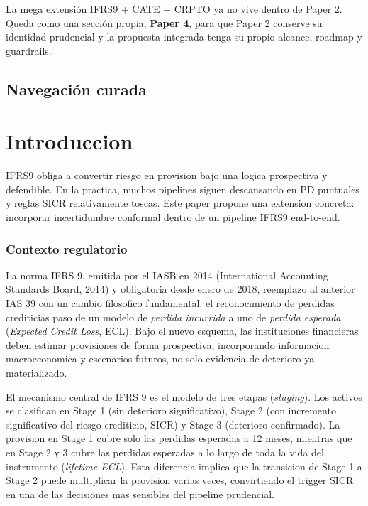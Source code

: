 \documentclass[
  spanish,
  11pt,
  letterpaper,
]{scrbook}
\theoremstyle{plain}
\theoremstyle{remark}
\begin{document}
La mega extensión IFRS9 + CATE + CRPTO ya no vive dentro de Paper 2.
Queda como una sección propia, \textbf{Paper 4}, para que Paper 2
conserve su identidad prudencial y la propuesta integrada tenga su
propio alcance, roadmap y guardrails.

\section{Navegación curada}\label{navegaciuxf3n-curada-4}

\chapter{Introduccion}\label{sec-p2-intro}

IFRS9 obliga a convertir riesgo en provision bajo una logica prospectiva
y defendible. En la practica, muchos pipelines siguen descansando en PD
puntuales y reglas SICR relativamente toscas. Este paper propone una
extension concreta: incorporar incertidumbre conformal dentro de un
pipeline IFRS9 end-to-end.

\subsection{Contexto regulatorio}\label{sec-p2-regulatory}

La norma IFRS 9, emitida por el IASB en 2014 (International Accounting
Standards Board, 2014) y obligatoria desde enero de 2018, reemplazo al
anterior IAS 39 con un cambio filosofico fundamental: el reconocimiento
de perdidas crediticias paso de un modelo de \emph{perdida incurrida} a
uno de \emph{perdida esperada} (\emph{Expected Credit Loss}, ECL). Bajo
el nuevo esquema, las instituciones financieras deben estimar
provisiones de forma prospectiva, incorporando informacion
macroeconomica y escenarios futuros, no solo evidencia de deterioro ya
materializado.

El mecanismo central de IFRS 9 es el modelo de tres etapas
(\emph{staging}). Los activos se clasifican en Stage 1 (sin deterioro
significativo), Stage 2 (con incremento significativo del riesgo
crediticio, SICR) y Stage 3 (deterioro confirmado). La provision en
Stage 1 cubre solo las perdidas esperadas a 12 meses, mientras que en
Stage 2 y 3 cubre las perdidas esperadas a lo largo de toda la vida del
instrumento (\emph{lifetime ECL}). Esta diferencia implica que la
transicion de Stage 1 a Stage 2 puede multiplicar la provision varias
veces, convirtiendo el trigger SICR en una de las decisiones mas
sensibles del pipeline prudencial.
\end{document}
